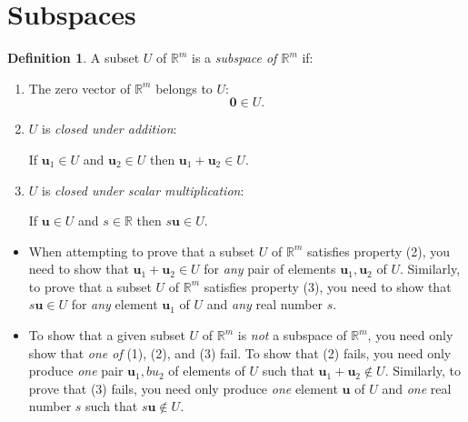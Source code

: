 \documentclass[12pt]{amsart}
\newcommand{\RR}{\mathbb{R}}
\theoremstyle{definition} \newtheorem{definition}[theorem]{Definition}
\newcommand{\bu}{\mathbf{u}}
\newcommand{\bzero}{\mathbf{0}}
\begin{document}
\section{Subspaces}

\begin{definition}\label{df:subspace}
  A subset $U$ of $\RR^m$ is a \emph{subspace of $\RR^m$} if:
  \begin{enumerate}
    \item The zero vector of $\RR^m$ belongs to $U$:
      \[
        \bzero\in U.
      \]
    \item $U$ is \emph{closed under addition}:
      \begin{center}
        If $\bu_1\in U$ and $\bu_2\in U$ then $\bu_1+\bu_2\in U$.
      \end{center}
    \item $U$ is \emph{closed under scalar multiplication}:
      \begin{center}
        If $\bu\in U$ and $s\in \RR$ then $s\bu\in U$.
      \end{center}
  \end{enumerate}
\end{definition}

\begin{remarks}\hfill
  \begin{itemize}
\item When attempting to prove that a subset $U$ of $\RR^m$ satisfies property (2), you need to show that $\bu_1+\bu_2\in U$ for \emph{any} pair of elements $\bu_1, \bu_2$ of $U$.
  Similarly, to prove that a subset $U$ of $\RR^m$ satisfies property (3), you need to show that $s\bu\in U$ for \emph{any} element $\bu_1$ of $U$ and \emph{any} real number $s$.

\item To show that a given subset $U$ of $\RR^m$ is \emph{not} a subspace of $\RR^m$, you need only show that \emph{one of} (1), (2), and (3) fail.
  To show that (2) fails, you need only produce \emph{one} pair $\bu_1, bu_2$ of elements of $U$ such that $\bu_1+\bu_2\notin U$.
  Similarly, to prove that (3) fails, you need only produce \emph{one} element $\bu$ of $U$ and \emph{one} real number $s$ such that $s\bu \notin U$.
  \end{itemize}
\end{remarks}
\end{document}
